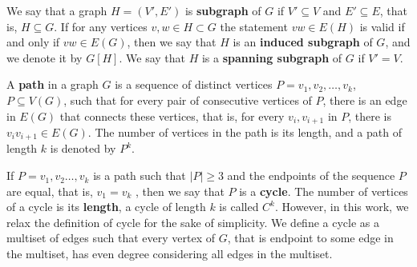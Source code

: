 
We say that a graph \(H = (V' , E')\) is \textbf{subgraph} of \(G\) if \(V' \subseteq V\) and \(E' \subseteq E\), that is, \(H \subseteq G\). If for any vertices \(v, w \in H \subset G\) the statement \(vw \in E(H)\) is valid if and only if \(vw \in E(G)\), then we say that \(H\) is an \textbf{induced subgraph} of \(G\), and we denote it by \(G[H]\). We say that \(H\) is a \textbf{spanning subgraph} of \(G\) if \(V' = V\).


A \textbf{path} in a graph \(G\) is a sequence of distinct vertices \(P = v_1, v_2, \dots, v_k\), \(P \subseteq V(G)\), such that for every pair of consecutive vertices of \(P\), there is an edge in \(E(G)\) that connects these vertices, that is, for every \(v_i , v_{i+1}\) in \(P\), there is \(v_i v _{i+1} \in E(G)\). The number of vertices in the path is its length, and a path of length \(k\) is denoted by \(P^k\).


If \(P = v_1, v_2 \dots, v_k\) is a path such that \(|P| \geq 3\) and the endpoints of the sequence \(P\) are equal, that is, \(v_1 = v_k\) , then we say that \(P\) is a \textbf{cycle}. The number of vertices of a cycle is its \textbf{length}, a cycle of length \(k\) is called \(C^k\). However, in this work, we relax the definition of cycle for the sake of simplicity. We define a cycle as a multiset of edges such that every vertex of \(G\), that is endpoint to some edge in the multiset, has even degree considering all edges in the multiset. 

